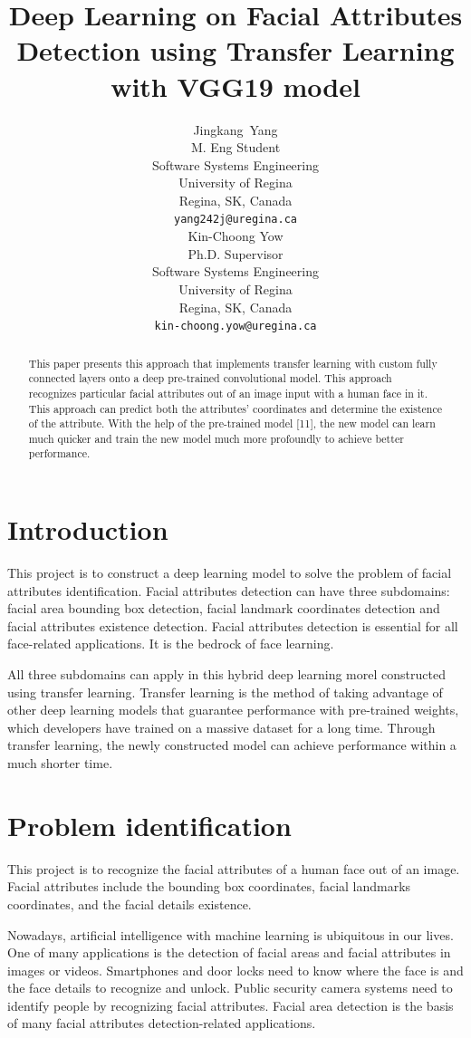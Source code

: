 \documentclass{article}
\title{Deep Learning on Facial Attributes Detection using Transfer Learning with VGG19 model}
\author{
  Jingkang~Yang\\
  M. Eng Student\\
  Software Systems Engineering\\
  University of Regina\\
  Regina, SK, Canada\\
  \texttt{yang242j@uregina.ca}\\
  \And
  Kin-Choong Yow\\
  Ph.D. Supervisor\\
  Software Systems Engineering\\
  University of Regina\\
  Regina, SK, Canada\\
  \texttt{kin-choong.yow@uregina.ca}\\
}
\begin{document}
\maketitle

\begin{abstract}
  This paper presents this approach that implements transfer learning with custom fully connected layers onto a deep pre-trained convolutional model. This approach recognizes particular facial attributes out of an image input with a human face in it. This approach can predict both the attributes' coordinates and determine the existence of the attribute. With the help of the pre-trained model [11], the new model can learn much quicker and train the new model much more profoundly to achieve better performance. 
\end{abstract}

\section{Introduction}
\label{introduction}
This project is to construct a deep learning model to solve the problem of facial attributes identification. Facial attributes detection can have three subdomains: facial area bounding box detection, facial landmark coordinates detection and facial attributes existence detection. Facial attributes detection is essential for all face-related applications. It is the bedrock of face learning.

All three subdomains can apply in this hybrid deep learning morel constructed using transfer learning. Transfer learning is the method of taking advantage of other deep learning models that guarantee performance with pre-trained weights, which developers have trained on a massive dataset for a long time. Through transfer learning, the newly constructed model can achieve performance within a much shorter time.


\section{Problem identification}
\label{problem}
This project is to recognize the facial attributes of a human face out of an image. Facial attributes include the bounding box coordinates, facial landmarks coordinates, and the facial details existence. 

Nowadays, artificial intelligence with machine learning is ubiquitous in our lives. One of many applications is the detection of facial areas and facial attributes in images or videos. Smartphones and door locks need to know where the face is and the face details to recognize and unlock. Public security camera systems need to identify people by recognizing facial attributes. Facial area detection is the basis of many facial attributes detection-related applications.
\end{document}
